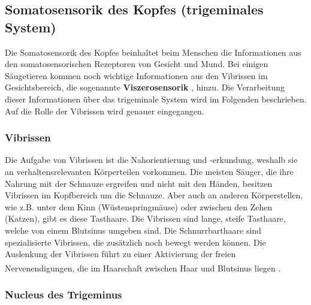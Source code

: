 \documentclass[12pt,a4paper,pdftex]{article}
\begin{document}
\newpage
\subsection{Somatosensorik des Kopfes (trigeminales System) }
\label{sec:somatokopf}
Die Somatosensorik des Kopfes beinhaltet beim Menschen die Informationen aus den somatosensorischen Rezeptoren von Gesicht und Mund. Bei einigen Säugetieren kommen noch wichtige Informationen aus den Vibrissen im Gesichtsbereich, die sogenannte \textbf{Viszerosensorik} , hinzu. Die Verarbeitung dieser Informationen über das trigeminale System wird im Folgenden beschrieben. Auf die Rolle der Vibrissen wird genauer eingegangen.

\subsubsection*{Vibrissen}
Die Aufgabe von Vibrissen ist die Nahorientierung und -erkundung, weshalb sie an verhaltensrelevanten Körperteilen vorkommen. Die meisten Säuger, die ihre Nahrung mit der Schnauze ergreifen und nicht mit den Händen, besitzen Vibrissen im Kopfbereich um die Schnauze. Aber auch an anderen Körperstellen, wie z.B. unter dem Kinn (Wüstenspringmäuse) oder zwischen den Zehen (Katzen), gibt es diese Tasthaare. Die Vibrissen sind lange, steife Tasthaare, welche von einem Blutsinus umgeben sind. Die Schnurrbarthaare  sind spezialisierte Vibrissen, die zusätzlich noch bewegt werden können. 
Die Auslenkung der Vibrissen führt zu einer Aktivierung der freien Nervenendigungen, die im Haarschaft zwischen Haar und Blutsinus liegen \textsuperscript{\cite[5]{heldmaier2003tierphysiologie}}.

\subsubsection*{Nucleus des Trigeminus}
\end{document}
